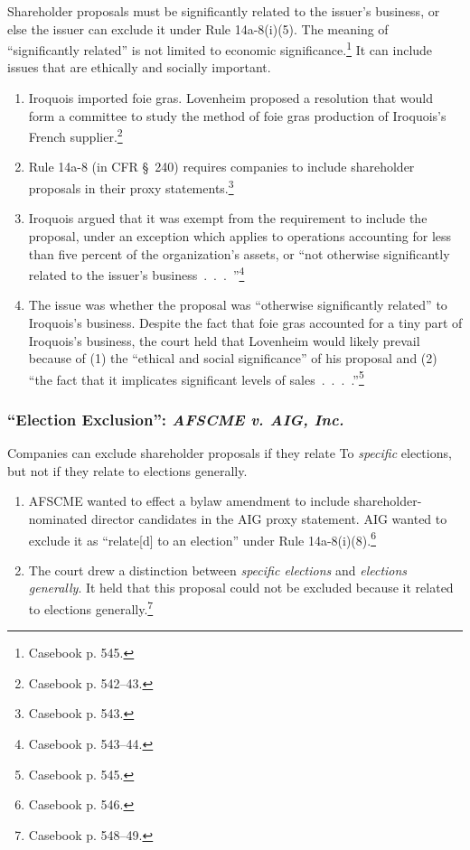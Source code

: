 Shareholder proposals must be significantly related to the issuer's business, 
or else the issuer can exclude it under Rule 14a-8(i)(5). The meaning of 
``significantly related'' is not limited to economic 
significance.\footnote{Casebook p. 545.} It can include issues that are 
ethically and socially important.

\begin{enumerate}
    \item Iroquois imported foie gras. Lovenheim proposed a resolution that 
    would form a committee to study the method of foie gras production of 
    Iroquois's French supplier.\footnote{Casebook p. 542--43.}
    \item Rule 14a-8 (in CFR \S\ 240) requires companies to include 
    shareholder proposals in their proxy statements.\footnote{Casebook p. 
    543.}
    \item Iroquois argued that it was exempt from the requirement to include 
    the proposal, under an exception which applies to operations accounting 
    for less than five percent of the organization's assets, or ``not 
    otherwise significantly related to the issuer's 
    business~.~.~.~''\footnote{Casebook p. 543--44.}
    \item The issue was whether the proposal was ``otherwise significantly 
    related'' to Iroquois's business. Despite the fact that foie gras 
    accounted for a tiny part of Iroquois's business, the court held that 
    Lovenheim would likely prevail because of (1) the ``ethical and social 
    significance'' of his proposal and (2) ``the fact that it implicates 
    significant levels of sales~.~.~.~.''\footnote{Casebook p. 545.}
\end{enumerate}

\subsubsection{``Election Exclusion'': \emph{AFSCME v. AIG, Inc.}}

Companies can exclude shareholder proposals if they relate To \emph{specific} 
elections, but not if they relate to elections generally.

\begin{enumerate}
    \item AFSCME wanted to effect a bylaw amendment to include 
    shareholder-nominated director candidates in the AIG proxy statement. AIG 
    wanted to exclude it as ``relate[d] to an election'' under Rule 
    14a-8(i)(8).\footnote{Casebook p. 546.}
    \item The court drew a distinction between \emph{specific elections} and 
    \emph{elections generally}. It held that this proposal could not be 
    excluded because it related to elections generally.\footnote{Casebook p. 
    548--49.}
\end{enumerate}

